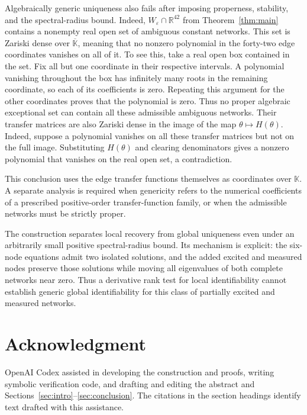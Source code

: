 \documentclass[letterpaper,10pt,conference]{ieeeconf}
\begin{document}
Algebraically generic uniqueness also fails after imposing properness,
stability, and the spectral-radius bound.
Indeed, \(W_\varepsilon\cap\mathbb R^{42}\) from
Theorem~\ref{thm:main} contains a nonempty real open set of ambiguous
constant networks. This set is Zariski dense over
\(\overline{\mathbb K}\), meaning that no nonzero polynomial in the
forty-two edge coordinates vanishes on all of it.
To see this, take a real open box contained in the set. Fix all but
one coordinate in their respective intervals. A polynomial vanishing
throughout the box has infinitely many roots in the remaining
coordinate, so each of its coefficients is zero. Repeating this
argument for the other coordinates proves that the polynomial is zero.
Thus no proper algebraic exceptional set can contain all these
admissible ambiguous networks.
Their transfer matrices are also Zariski dense in the image of
the map \(\theta\mapsto H(\theta)\).
Indeed, suppose a polynomial vanishes on all these transfer matrices but
not on the full image. Substituting \(H(\theta)\) and clearing
denominators gives a nonzero polynomial that vanishes on the real
open set, a contradiction.

This conclusion uses the edge transfer functions themselves as
coordinates over \(\mathbb K\). A separate analysis is required
when genericity refers to the numerical coefficients of a prescribed
positive-order transfer-function family, or when the admissible
networks must be strictly proper.

The construction separates local recovery from global uniqueness even
under an arbitrarily small positive spectral-radius bound. Its mechanism
is explicit: the six-node equations admit two isolated solutions, and
the added excited and measured nodes preserve those solutions while
moving all eigenvalues of both complete networks near zero. Thus a derivative rank
test for local identifiability cannot establish generic global
identifiability for this class of partially excited and measured
networks.

\clearpage
\balance
\section*{Acknowledgment}
OpenAI Codex \cite{codex} assisted in developing the construction and
proofs, writing symbolic verification code, and drafting and editing
the abstract and Sections~\ref{sec:intro}--\ref{sec:conclusion}.
The citations in the section headings identify text drafted with this
assistance.
\end{document}
